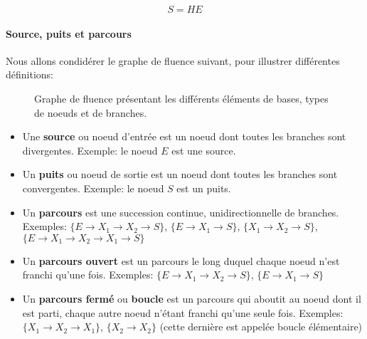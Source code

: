 \begin{center}
    
$$
S=HE
$$
\end{center}

\paragraph{Source, puits et parcours}
Nous allons condidérer le graphe de fluence suivant, pour illustrer 
différentes définitions: 

\begin{figure}[!h]
\begin{center}
    
\end{center}
    \caption{Graphe de fluence présentant les différents éléments de bases, 
    types de noeuds et de branches.}
\end{figure}

\begin{itemize}
    \item Une \textbf{source} ou noeud d'entrée est un noeud 
          dont toutes les branches sont divergentes. Exemple: le noeud 
          $E$ est une source.
    \item Un \textbf{puits} ou noeud de sortie est un noeud dont toutes 
    les branches sont convergentes. Exemple: le noeud $S$ est un puits.
    \item Un \textbf{parcours} est une succession continue, 
    unidirectionnelle de branches. Exemples: 
    $\{E\rightarrow X_1\rightarrow X_2\rightarrow S\}$, 
    $\{E\rightarrow X_1\rightarrow S\}$, 
    $\{X_1\rightarrow X_2\rightarrow S\}$, 
    $\{E\rightarrow X_1\rightarrow X_2\rightarrow X_1\rightarrow S\}$

    \item Un \textbf{parcours ouvert} est un parcours le long duquel chaque 
          noeud n'est franchi qu'une fois. Exemples: 
          $\{E\rightarrow X_1\rightarrow X_2\rightarrow S\}$, 
          $\{E\rightarrow X_1 \rightarrow S\}$
    \item Un \textbf{parcours fermé} ou \textbf{boucle} est un parcours qui 
          aboutit au noeud dont il est parti, chaque autre noeud n'étant 
          franchi qu'une seule fois. Exemples: 
          $\{X_1\rightarrow X_2\rightarrow X_1\}$, 
          $\{X_2\rightarrow X_2\}$ (cette dernière est appelée boucle 
          élémentaire)
\end{itemize}

